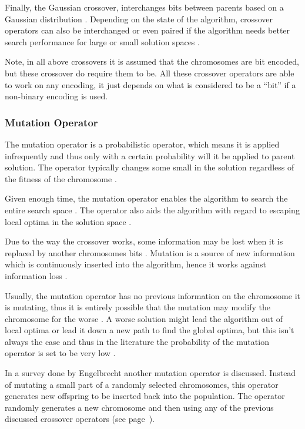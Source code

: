 Finally, the Gaussian crossover, interchanges bits between parents based on a Gaussian distribution \cite{ParallelGASA,GeostatisticalGA}. Depending on the state of the algorithm, crossover operators can also be interchanged or even paired if the algorithm needs better search performance for large or small solution spaces \cite{HetergeneousGA,ParallelGASA}.

Note, in all above crossovers it is assumed that the chromosomes are bit encoded, but these crossover do require them to be. All these crossover operators are able to work on any encoding, it just depends on what is considered to be a ``bit'' if a non-binary encoding is used. 

\subsubsection{Mutation Operator}
The mutation operator is a probabilistic operator, which means it is applied infrequently and thus only with a certain probability will it be applied to parent solution. The operator typically changes some small in the solution regardless of the fitness of the chromosome \cite{HybridBaldwinGA,HumanPassiveGA}.

Given enough time, the mutation operator enables the algorithm to search the entire search space \cite{FamilyGA}. The operator also aids the algorithm with regard to escaping local optima in the solution space \cite{FamilyGA}.

Due to the way the crossover works, some information may be lost when it is replaced by another chromosomes bits \cite{AcceleratingGA,ConstrainedGA}. Mutation is a source of new information which is continuously inserted into the algorithm, hence it works against information loss \cite{CoactiveFuzzyGA,AcceleratingGA,ConstrainedGA}. 

Usually, the mutation operator has no previous information on the chromosome it is mutating, thus it is entirely possible that the mutation may modify the chromosome for the worse \cite{AcceleratingGA}. A worse solution might lead the algorithm out of local optima or lead it down a new path to find the global optima, but this isn't always the case and thus in the literature the probability of the mutation operator is set to be very low \cite{AdaptiveSAGA,FamilyGA,ConstrainedGA}.

In a survey done by Engelbrecht\cite{CompuIntelligenceIntro} another mutation operator is discussed. Instead of mutating a small part of a randomly selected chromosomes, this operator generates new offspring to be inserted back into the population. The operator randomly generates a new chromosome and then using any of the previous discussed crossover operators (see page~\pageref{sec:crossover}).

